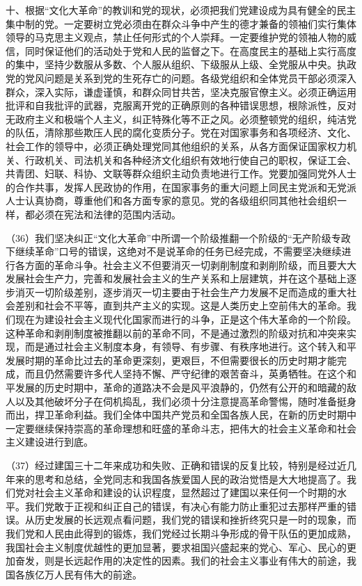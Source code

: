 十、根据“文化大革命”的教训和党的现状，必须把我们党建设成为具有健全的民主集中制的党。一定要树立党必须由在群众斗争中产生的德才兼备的领袖们实行集体领导的马克思主义观点，禁止任何形式的个人崇拜。一定要维护党的领袖人物的威信，同时保证他们的活动处于党和人民的监督之下。在高度民主的基础上实行高度的集中，坚持少数服从多数、个人服从组织、下级服从上级、全党服从中央。执政党的党风问题是关系到党的生死存亡的问题。各级党组织和全体党员干部必须深入群众，深入实际，谦虚谨慎，和群众同甘共苦，坚决克服官僚主义。必须正确运用批评和自我批评的武器，克服离开党的正确原则的各种错误思想，根除派性，反对无政府主义和极端个人主义，纠正特殊化等不正之风。必须整顿党的组织，纯洁党的队伍，清除那些欺压人民的腐化变质分子。党在对国家事务和各项经济、文化、社会工作的领导中，必须正确处理党同其他组织的关系，从各方面保证国家权力机关、行政机关、司法机关和各种经济文化组织有效地行使自己的职权，保证工会、共青团、妇联、科协、文联等群众组织主动负责地进行工作。党要加强同党外人士的合作共事，发挥人民政协的作用，在国家事务的重大问题上同民主党派和无党派人士认真协商，尊重他们和各方面专家的意见。党的各级组织同其他社会组织一样，都必须在宪法和法律的范围内活动。

（36）我们坚决纠正“文化大革命”中所谓一个阶级推翻一个阶级的“无产阶级专政下继续革命”口号的错误，这绝对不是说革命的任务已经完成，不需要坚决继续进行各方面的革命斗争。社会主义不但要消灭一切剥削制度和剥削阶级，而且要大大发展社会生产力，完善和发展社会主义的生产关系和上层建筑，并在这个基础上逐步消灭一切阶级差别，逐步消灭一切主要由于社会生产力发展不足而造成的重大社会差别和社会不平等，直到共产主义的实现。这是人类历史上空前伟大的革命。我们现在为建设社会主义现代化国家而进行的斗争，正是这个伟大革命的一个阶段。这种革命和剥削制度被推翻以前的革命不同，不是通过激烈的阶级对抗和冲突来实现，而是通过社会主义制度本身，有领导、有步骤、有秩序地进行。这个转入和平发展时期的革命比过去的革命更深刻，更艰巨，不但需要很长的历史时期才能完成，而且仍然需要许多代人坚持不懈、严守纪律的艰苦奋斗，英勇牺牲。在这个和平发展的历史时期中，革命的道路决不会是风平浪静的，仍然有公开的和暗藏的敌人以及其他破坏分子在伺机捣乱，我们必须十分注意提高革命警惕，随时准备挺身而出，捍卫革命利益。我们全体中国共产党员和全国各族人民，在新的历史时期中一定要继续保持崇高的革命理想和旺盛的革命斗志，把伟大的社会主义革命和社会主义建设进行到底。

（37）经过建国三十二年来成功和失败、正确和错误的反复比较，特别是经过近几年来的思考和总结，全党同志和我国各族爱国人民的政治觉悟是大大地提高了。我们党对社会主义革命和建设的认识程度，显然超过了建国以来任何一个时期的水平。我们党敢于正视和纠正自己的错误，有决心有能力防止重犯过去那样严重的错误。从历史发展的长远观点看问题，我们党的错误和挫折终究只是一时的现象，而我们党和人民由此得到的锻炼，我们党经过长期斗争形成的骨干队伍的更加成熟，我国社会主义制度优越性的更加显著，要求祖国兴盛起来的党心、军心、民心的更加奋发，则是长远起作用的决定性的因素。我们的社会主义事业有伟大的前途，我国各族亿万人民有伟大的前途。

